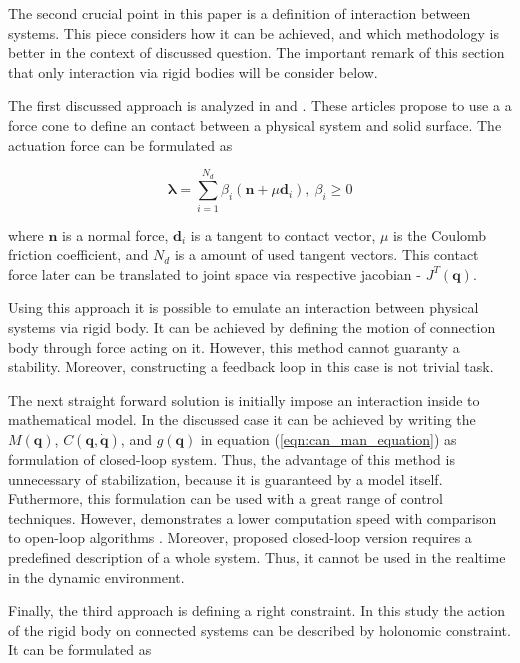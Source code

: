 The second crucial point in this paper is a definition of interaction between 
systems. This piece considers how it can be achieved, and which methodology 
is better in the context of discussed question. The important remark of this 
section that only interaction via rigid bodies will be consider below.

The first discussed approach is analyzed in \cite{OptimizationBasedLocomotionPlanning} 
and \cite{WholeBodyControlForm}. These articles propose to use a 
a force cone to define an contact between a physical system 
and solid surface. The actuation force can be formulated as 

\begin{equation}
    \label{eqn:force_cone}
    \pmb{\lambda} = \sum_{i=1}^{N_d} \beta_i (\mathbf{n} + \mu \mathbf{d}_i), 
    \: \beta_i \ge 0
\end{equation}

where $\mathbf{n}$ is a normal force, $\mathbf{d}_i$ is a tangent to contact 
vector, $\mu$ is the Coulomb friction coefficient, and $N_d$ is a amount
of used tangent vectors. This contact force later can be translated to 
joint space via respective jacobian - $J^T(\mathbf{q})$.

Using this approach it is possible to emulate an interaction between 
physical systems via rigid body. It can be achieved by defining the motion 
of connection body through force acting on it. However, this method cannot 
guaranty a stability. Moreover, constructing a feedback loop in this case is 
not trivial task. 

The next straight forward solution is initially impose an interaction inside 
to mathematical model. In the discussed case it can be achieved by writing 
the $M(\mathbf{q})$, $C(\mathbf{q}, \dot{\mathbf{q}})$, and $g(\mathbf{q})$ 
in equation (\ref{eqn:can_man_equation}) as formulation of closed-loop system. 
Thus, the advantage of this method is unnecessary of stabilization, because 
it is guaranteed by a model itself. Futhermore, this formulation can be 
used with a great range of control techniques. However, \cite{BodyDynWithClosedLoop} 
demonstrates a lower computation speed with comparison to 
open-loop algorithms \cite{Pinocchio}. Moreover, proposed closed-loop 
version requires a predefined description of a whole system. Thus, it cannot 
be used in the realtime in the dynamic environment.

Finally, the third approach is defining a right constraint. In this study the action 
of the rigid body on connected systems can be described by holonomic constraint. 
It can be formulated as 

